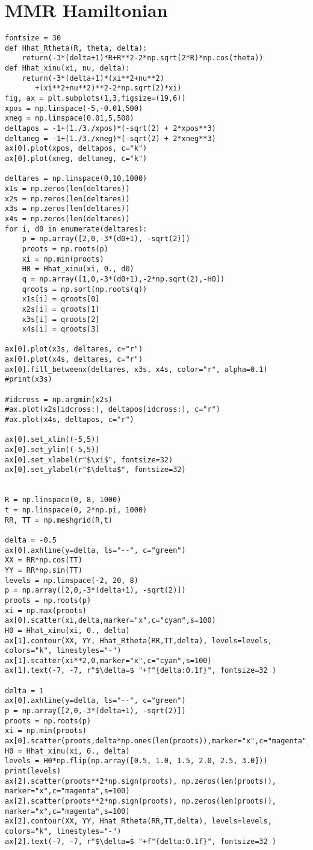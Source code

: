 \documentclass[11pt]{article}
\begin{document}
\section{MMR Hamiltonian}
\label{sec:orgf0566f3}
\begin{verbatim}
fontsize = 30
def Hhat_Rtheta(R, theta, delta):
    return(-3*(delta+1)*R+R**2-2*np.sqrt(2*R)*np.cos(theta))
def Hhat_xinu(xi, nu, delta):
    return(-3*(delta+1)*(xi**2+nu**2)
	   +(xi**2+nu**2)**2-2*np.sqrt(2)*xi)
fig, ax = plt.subplots(1,3,figsize=(19,6))
xpos = np.linspace(-5,-0.01,500)
xneg = np.linspace(0.01,5,500)
deltapos = -1+(1./3./xpos)*(-sqrt(2) + 2*xpos**3)
deltaneg = -1+(1./3./xneg)*(-sqrt(2) + 2*xneg**3)
ax[0].plot(xpos, deltapos, c="k")
ax[0].plot(xneg, deltaneg, c="k")

deltares = np.linspace(0,10,1000) 
x1s = np.zeros(len(deltares))
x2s = np.zeros(len(deltares))
x3s = np.zeros(len(deltares))
x4s = np.zeros(len(deltares))
for i, d0 in enumerate(deltares):
    p = np.array([2,0,-3*(d0+1), -sqrt(2)])
    proots = np.roots(p)
    xi = np.min(proots)
    H0 = Hhat_xinu(xi, 0., d0)
    q = np.array([1,0,-3*(d0+1),-2*np.sqrt(2),-H0])
    qroots = np.sort(np.roots(q))
    x1s[i] = qroots[0]
    x2s[i] = qroots[1]
    x3s[i] = qroots[2]
    x4s[i] = qroots[3]

ax[0].plot(x3s, deltares, c="r")
ax[0].plot(x4s, deltares, c="r")
ax[0].fill_betweenx(deltares, x3s, x4s, color="r", alpha=0.1)
#print(x3s)

#idcross = np.argmin(x2s)
#ax.plot(x2s[idcross:], deltapos[idcross:], c="r")
#ax.plot(x4s, deltapos, c="r")

ax[0].set_xlim((-5,5))
ax[0].set_ylim((-5,5))
ax[0].set_xlabel(r"$\xi$", fontsize=32)
ax[0].set_ylabel(r"$\delta$", fontsize=32)


R = np.linspace(0, 8, 1000)
t = np.linspace(0, 2*np.pi, 1000)
RR, TT = np.meshgrid(R,t)

delta = -0.5
ax[0].axhline(y=delta, ls="--", c="green")
XX = RR*np.cos(TT)
YY = RR*np.sin(TT)
levels = np.linspace(-2, 20, 8)
p = np.array([2,0,-3*(delta+1), -sqrt(2)])
proots = np.roots(p)
xi = np.max(proots)
ax[0].scatter(xi,delta,marker="x",c="cyan",s=100)
H0 = Hhat_xinu(xi, 0., delta)
ax[1].contour(XX, YY, Hhat_Rtheta(RR,TT,delta), levels=levels, colors="k", linestyles="-")
ax[1].scatter(xi**2,0,marker="x",c="cyan",s=100)
ax[1].text(-7, -7, r"$\delta=$ "+f"{delta:0.1f}", fontsize=32 )

delta = 1
ax[0].axhline(y=delta, ls="--", c="green")
p = np.array([2,0,-3*(delta+1), -sqrt(2)])
proots = np.roots(p)
xi = np.min(proots)
ax[0].scatter(proots,delta*np.ones(len(proots)),marker="x",c="magenta",s=100)
H0 = Hhat_xinu(xi, 0., delta)
levels = H0*np.flip(np.array([0.5, 1.0, 1.5, 2.0, 2.5, 3.0]))
print(levels)
ax[2].scatter(proots**2*np.sign(proots), np.zeros(len(proots)), marker="x",c="magenta",s=100)
ax[2].scatter(proots**2*np.sign(proots), np.zeros(len(proots)), marker="x",c="magenta",s=100)
ax[2].contour(XX, YY, Hhat_Rtheta(RR,TT,delta), levels=levels, colors="k", linestyles="-")
ax[2].text(-7, -7, r"$\delta=$ "+f"{delta:0.1f}", fontsize=32 )


\end{verbatim}
\end{document}
